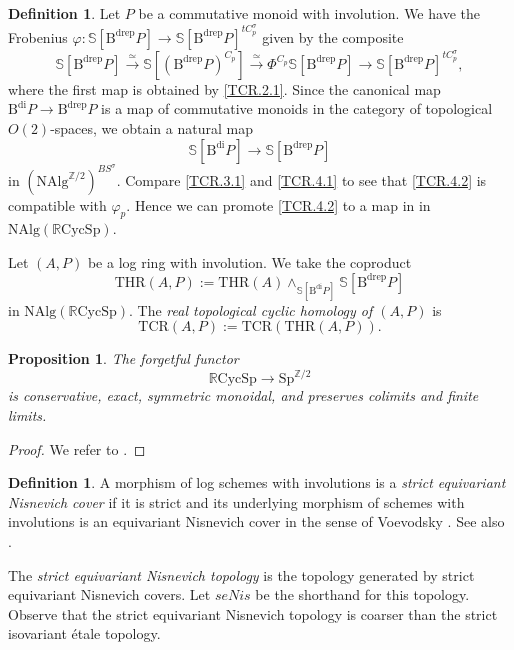 \documentclass[10pt]{amsart}
\newtheorem{prop}[thm]{Proposition}
\theoremstyle{definition}
\newtheorem{df}[thm]{Definition}
\theoremstyle{remark}
\numberwithin{equation}{section}
\newcommand{\Sphere}{\mathbb{S}}
\newcommand{\Z}{\mathbb{Z}}
\newcommand{\Sp}{\mathrm{Sp}}
\newcommand{\NAlg}{\mathrm{NAlg}}
\newcommand{\Bdi}{\mathrm{B}^{\mathrm{di}}}
\newcommand{\Bdrep}{\mathrm{B}^\mathrm{drep}}
\newcommand{\RCycSp}{\mathbb{R}\mathrm{CycSp}}
\newcommand{\THR}{\mathrm{THR}}
\newcommand{\TCR}{\mathrm{TCR}}
\newcommand{\Ztwo}{{\mathbb{Z}/2}}
\begin{document}
\begin{df}
\label{TCR.4}
Let $P$ be a commutative monoid with involution.
We have the Frobenius $\varphi\colon \Sphere[\Bdrep P]\to \Sphere[\Bdrep P]^{tC_p^\sigma}$ given by the composite
\begin{equation}
\label{TCR.4.1}
\Sphere[\Bdrep P]
\xrightarrow{\simeq}
\Sphere[(\Bdrep P)^{C_p}]
\xrightarrow{\simeq}
\Phi^{C_p}\Sphere[\Bdrep P]
\to
\Sphere[\Bdrep P]^{tC_p^\sigma},
\end{equation}
where the first map is obtained by \eqref{TCR.2.1}.
Since the canonical map $\Bdi P\to \Bdrep P$ is a map of commutative monoids in the category of topological $O(2)$-spaces,
we obtain a natural map
\begin{equation}
\label{TCR.4.2}
\Sphere[\Bdi P]\to \Sphere[\Bdrep P]
\end{equation}
in $(\NAlg^{\Z/2})^{BS^\sigma}$.
Compare \eqref{TCR.3.1} and \eqref{TCR.4.1} to see that \eqref{TCR.4.2} is compatible with $\varphi_p$.
Hence we can promote \eqref{TCR.4.2} to a map in 
in $\NAlg(\RCycSp)$.


Let $(A,P)$ be a log ring with involution.
We take the coproduct
\[
\THR(A,P)
:=
\THR(A)
\wedge_{\Sphere[\Bdi P]}
\Sphere[\Bdrep P]
\]
in $\NAlg(\RCycSp)$.
The \emph{real topological cyclic homology of $(A,P)$} is
\[
\TCR(A,P)
:=
\TCR(\THR(A,P)).
\]
\end{df}




\begin{prop}
\label{TCR.5}
The forgetful functor
\[
\RCycSp
\to
\Sp^{\Ztwo}
\]
is conservative, exact, symmetric monoidal, and preserves colimits and finite limits.
\end{prop}
\begin{proof}
We refer to \cite[Remark 4.3]{QS2}.
\end{proof}


\begin{df}
A morphism of log schemes with involutions is a \emph{strict equivariant Nisnevich cover} if it is strict and its underlying morphism of schemes with involutions is an equivariant Nisnevich cover in the sense of Voevodsky \cite[\S 3.1]{zbMATH05645855}.
See also \cite[\S 2]{HeKO}.

The \emph{strict equivariant Nisnevich topology} is the topology generated by strict equivariant Nisnevich covers.
Let $seNis$ be the shorthand for this topology.
Observe that the strict equivariant Nisnevich topology is coarser than the strict isovariant \'etale topology.
\end{df}
\end{document}
